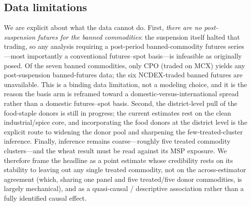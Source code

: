 \subsection{Data limitations}
\label{subsec:limits}

We are explicit about what the data cannot do. First, \emph{there are no post-suspension futures for
the banned commodities}: the suspension itself halted that trading, so any analysis requiring a
post-period banned-commodity futures series---most importantly a conventional futures--spot basis---is
infeasible as originally posed. Of the seven banned commodities, only CPO (traded on MCX) yields any
post-suspension banned-futures data; the six NCDEX-traded banned futures are unavailable. This is a
binding data limitation, not a modeling choice, and it is the reason the basis arm is reframed toward
a domestic-versus-international spread rather than a domestic futures--spot basis. Second, the
district-level pull of the food-staple donors is still in progress; the current estimates rest on the
clean industrial/spice core, and incorporating the food donors at the district level is the explicit
route to widening the donor pool and sharpening the few-treated-cluster inference. Finally, inference
remains coarse---roughly five treated commodity clusters---and the wheat result must be read against
its MSP exposure. We therefore frame the headline as a point estimate whose credibility rests on its
stability to leaving out any single treated commodity, not on the across-estimator agreement (which,
sharing one panel and five treated/five donor commodities, is largely mechanical), and as a
quasi-causal / descriptive association rather than a fully identified causal effect.

